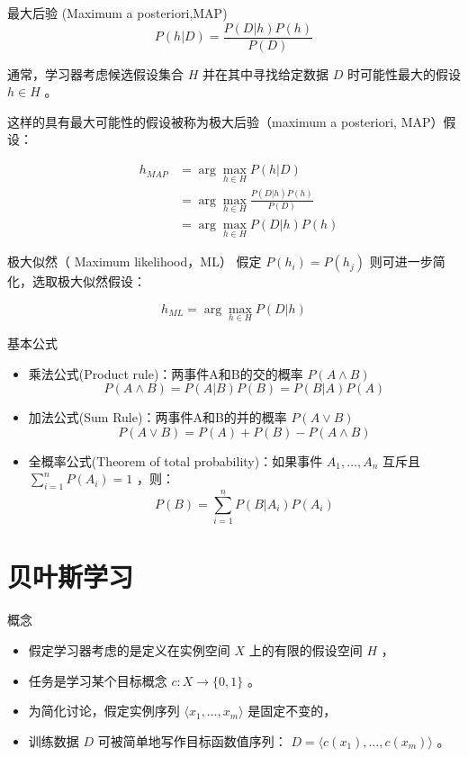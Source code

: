 \documentclass[presentation]{beamer}
\begin{document}
\begin{frame}[label={sec:org2b3d2c8}]{最大后验 (Maximum a posteriori,MAP)}
\[ P(h|D) = \frac{P(D|h) P(h)}{P(D)} \]

通常，学习器考虑候选假设集合 \(H\) 并在其中寻找给定数据 \(D\) 时可能性最大的假设 \(h\in H\) 。

这样的具有最大可能性的假设被称为极大后验（maximum a posteriori, MAP）假设：

\begin{eqnarray}
& h_{MAP} & = \arg \max_{h \in H} P(h|D)\nonumber \\
& & = \arg \max_{h \in H} \frac{P(D|h) P(h)}{P(D)} \nonumber \\
& & = \arg \max_{h \in H}P(D|h) P(h) \nonumber
\end{eqnarray}
\end{frame}

\begin{frame}[label={sec:org76f7c3e}]{极大似然（ Maximum likelihood，ML）}
假定 \(P(h_{i})=P(h_{j})\) 则可进一步简化，选取极大似然假设：

$$h_{ML}=\arg \max_{h \in H}P(D|h)$$
\end{frame}

\begin{frame}[label={sec:orgd379868}]{基本公式}
\begin{itemize}
\item 乘法公式(Product rule)：两事件A和B的交的概率 \(P(A \land B)\)
$$P(A \land B) = P(A|B) P(B) = P(B|A) P(A)$$
\item 加法公式(Sum Rule)：两事件A和B的并的概率 \(P(A\lor B)\)
$$P(A \lor B) = P(A) + P(B) - P(A \land B)$$
\item 全概率公式(Theorem of total probability)：如果事件 \(A_{1}, \ldots, A_{n}\) 互斥且 \(\sum_{i = 1}^{n} P(A_{i}) = 1\) ，则：
$$P(B) = \sum_{i = 1}^{n} P(B|A_{i}) P(A_{i})$$
\end{itemize}
\end{frame}

\section{贝叶斯学习}
\label{sec:orgd7bc570}
\begin{frame}[label={sec:org7de70c7}]{概念}
\begin{itemize}
\item 假定学习器考虑的是定义在实例空间 \(X\) 上的有限的假设空间 \(H\) ，
\item 任务是学习某个目标概念 \(c:X\rightarrow \{0,1\}\) 。
\item 为简化讨论，假定实例序列 \(\langle x_{1}, \ldots, x_{m}\rangle\) 是固定不变的，
\item 训练数据 \(D\) 可被简单地写作目标函数值序列： \(D = \langle c(x_{1}),\ldots, c(x_{m})\rangle\)  。
\end{itemize}
\end{frame}
\end{document}
